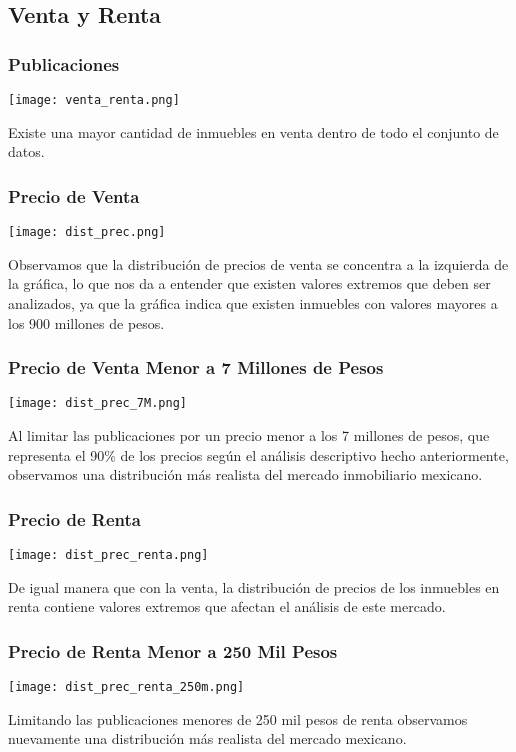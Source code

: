 \documentclass{report}
\begin{document}
\subsection{Venta y Renta}
\subsubsection{Publicaciones}
\begin{center}
\texttt{[image: venta\_renta.png]}
\end{center}
Existe una mayor cantidad de inmuebles en venta dentro de todo el conjunto de datos.

\subsubsection{Precio de Venta}
\begin{center}
\texttt{[image: dist\_prec.png]}
\end{center}
Observamos que la distribución de precios de venta se concentra a la izquierda de la gráfica, lo que nos da a entender que existen valores extremos que deben ser analizados, ya que la gráfica indica que existen inmuebles con valores mayores a los 900 millones de pesos.

\subsubsection{Precio de Venta Menor a 7 Millones de Pesos}
\begin{center}
\texttt{[image: dist\_prec\_7M.png]}
\end{center}
Al limitar las publicaciones por un precio menor a los 7 millones de pesos, que representa el 90\% de los precios según el análisis descriptivo hecho anteriormente, observamos una distribución más realista del mercado inmobiliario mexicano.

\subsubsection{Precio de Renta}
\begin{center}
\texttt{[image: dist\_prec\_renta.png]}
\end{center}
De igual manera que con la venta, la distribución de precios de los inmuebles en renta contiene valores extremos que afectan el análisis de este mercado.

\subsubsection{Precio de Renta Menor a 250 Mil Pesos}
\begin{center}
\texttt{[image: dist\_prec\_renta\_250m.png]}
\end{center}
Limitando las publicaciones menores de 250 mil pesos de renta observamos nuevamente una distribución más realista del mercado mexicano.
\end{document}
